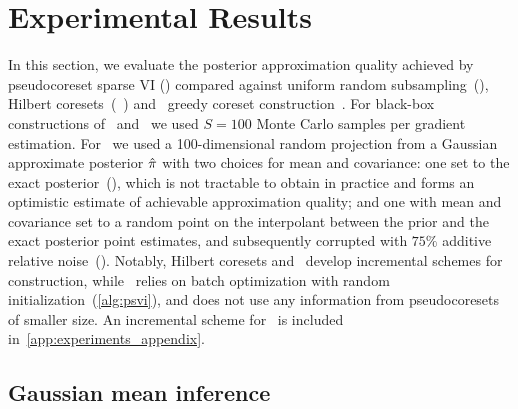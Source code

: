 \section{Experimental Results}
\label{sec:experiments}
In this section, we evaluate the posterior approximation quality achieved by
pseudocoreset sparse VI (\psvi) compared against uniform random subsampling~(\uniform), Hilbert
coresets~(\giga~\citep{campbell18}) and \sparsevi~greedy coreset
construction~\citep{campbell19neurips}.  For black-box constructions of \sparsevi~and \psvi~we used $S =
100$ Monte Carlo samples per gradient estimation. For \giga~we used a
100-dimensional random projection from a Gaussian approximate posterior $\hat{\pi}$
with  two choices for mean and covariance: one set to the exact
posterior~(\optimal), which is not tractable to obtain in practice and forms an
optimistic estimate of achievable approximation quality; and one with mean and
covariance set to a random point on the interpolant between the prior and the
exact posterior point estimates, and subsequently corrupted with $75\%$
additive relative noise~(\realistic). Notably, Hilbert coresets and
\sparsevi~develop incremental schemes for construction, while \psvi~relies on
batch optimization with random initialization~(\cref{alg:psvi}), and does not
use any information from pseudocoresets of smaller size. An incremental scheme
for \sparsevi~is included in~\cref{app:experiments_appendix}. %

\subsection{Gaussian mean inference}
\label{section:gaussian_experiment}

